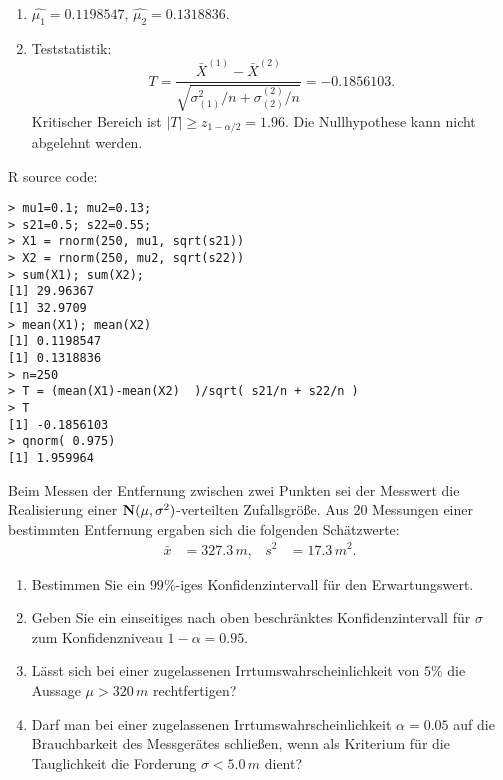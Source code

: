\solution
\begin{enumerate}
    \item $\hat{\mu_1} = 0.1198547$, $\hat{\mu_2} = 0.1318836$.
    \item Teststatistik:
        \begin{equation*}
            T = \frac{ \bar X^{(1)} - \bar X^{(2)}}{ \sqrt{ \sigma^{2}_{(1)}/n + \sigma^{(2)}_{(2)}/n }} = -0.1856103.
        \end{equation*}
        Kritischer Bereich ist $| T | \geq z_{1-\alpha/2} = 1.96$. Die
        Nullhypothese kann nicht abgelehnt werden.
\end{enumerate}
R source code:
\begin{lstlisting}
> mu1=0.1; mu2=0.13; 
> s21=0.5; s22=0.55;
> X1 = rnorm(250, mu1, sqrt(s21))
> X2 = rnorm(250, mu2, sqrt(s22))
> sum(X1); sum(X2);
[1] 29.96367
[1] 32.9709
> mean(X1); mean(X2)
[1] 0.1198547
[1] 0.1318836
> n=250
> T = (mean(X1)-mean(X2)  )/sqrt( s21/n + s22/n )
> T
[1] -0.1856103
> qnorm( 0.975)
[1] 1.959964
\end{lstlisting}

 Beim Messen der
Entfernung zwischen zwei Punkten sei der Messwert die Realisierung einer
$\mathbf N(\mu, \sigma^2)$-verteilten Zufallsgröße. Aus $20$ Messungen einer
bestimmten Entfernung ergaben sich die folgenden Schätzwerte:
\begin{align*}
    \bar x &= 327.3\,m, & s^2 &= 17.3\,m^2.
\end{align*}
\begin{enumerate}
    \item Bestimmen Sie ein $99\%$-iges Konfidenzintervall für den
        Erwartungswert.

    \item Geben Sie ein einseitiges nach oben beschränktes Konfidenzintervall
        für $\sigma$ zum Konfidenzniveau $1-\alpha= 0.95$. 

    \item Lässt sich bei einer zugelassenen Irrtumswahrscheinlichkeit von $5\%$
        die Aussage $\mu > 320\,m$ rechtfertigen?

    \item Darf man bei einer zugelassenen Irrtumswahrscheinlichkeit
        $\alpha=0.05$ auf die Brauchbarkeit des Messgerätes schließen, wenn als
        Kriterium für die Tauglichkeit die Forderung $\sigma < 5.0\,m $ dient?
\end{enumerate}


